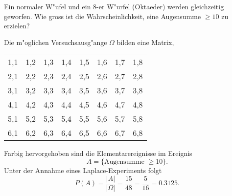 Ein normaler W"ufel und ein 8-er W"urfel (Oktaeder) werden gleichzeitig
geworfen. 
Wie gross ist die Wahrscheinlichkeit, eine Augensumme $\ge 10$ zu erzielen?

\begin{loesung}
Die m"oglichen Versuchsausg"ange $\Omega$ bilden eine Matrix,
\begin{center}
\begin{tabular}{|cccccccc|}
\hline
1,1&1,2&1,3&1,4&1,5&1,6&1,7&1,8\\
2,1&2,2&2,3&2,4&2,5&2,6&2,7&\color{red}2,8\\
3,1&3,2&3,3&3,4&3,5&3,6&\color{red}3,7&\color{red}3,8\\
4,1&4,2&4,3&4,4&4,5&\color{red}4,6&\color{red}4,7&\color{red}4,8\\
5,1&5,2&5,3&5,4&\color{red}5,5&\color{red}5,6&\color{red}5,7&\color{red}5,8\\
6,1&6,2&6,3&\color{red}6,4&\color{red}6,5&\color{red}6,6&\color{red}6,7&\color{red}6,8\\
\hline
\end{tabular}
\end{center}
Farbig hervorgehoben sind die Elementarereignisse im Ereignis
\[
A=\{\text{Augensumme $\ge 10$}\}.
\]
Unter der Annahme eines Laplace-Experiments folgt
\[
P(A)=\frac{|A|}{|\Omega|}=\frac{15}{48}=\frac{5}{16}=0.3125.
\]
\end{loesung}

